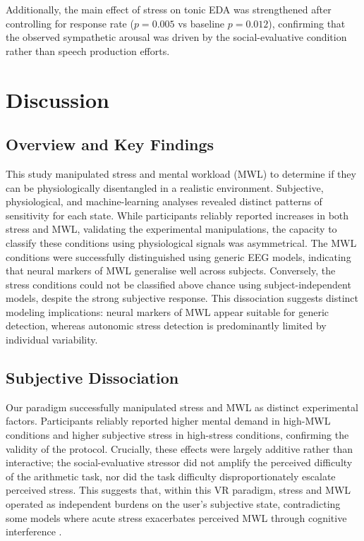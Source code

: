 \documentclass[lettersize,journal]{IEEEtran}
\begin{document}
Additionally, the main effect of stress on tonic EDA was strengthened after controlling for response rate ($p=0.005$ vs baseline $p=0.012$), confirming that the observed sympathetic arousal was driven by the social-evaluative condition rather than speech production efforts.

\section{Discussion}

\subsection{Overview and Key Findings}

This study manipulated stress and mental workload (MWL) to determine if they can be physiologically disentangled in a realistic environment. Subjective, physiological, and machine-learning analyses revealed distinct patterns of sensitivity for each state. While participants reliably reported increases in both stress and MWL, validating the experimental manipulations, the capacity to classify these conditions using physiological signals was asymmetrical. The MWL conditions were successfully distinguished using generic EEG models, indicating that neural markers of MWL generalise well across subjects. Conversely, the stress conditions could not be classified above chance using subject-independent models, despite the strong subjective response. This dissociation suggests distinct modeling implications: neural markers of MWL appear suitable for generic detection, whereas autonomic stress detection is predominantly limited by individual variability.

 


\subsection{Subjective Dissociation}

Our paradigm successfully manipulated stress and MWL as distinct experimental factors. Participants reliably reported higher mental demand in high-MWL conditions and higher subjective stress in high-stress conditions, confirming the validity of the protocol. Crucially, these effects were largely additive rather than interactive; the social-evaluative stressor did not amplify the perceived difficulty of the arithmetic task, nor did the task difficulty disproportionately escalate perceived stress. This suggests that, within this VR paradigm, stress and MWL operated as independent burdens on the user's subjective state, contradicting some models where acute stress exacerbates perceived MWL through cognitive interference \cite{matthewsDynamicRelationshipsStress2010, shieldsEffectsAcuteStress2016}.
\end{document}
